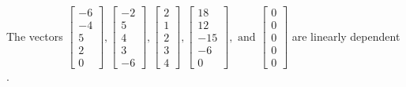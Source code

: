 \begin{exercise}
\begin{exerciseStatement}
  \end{exerciseStatement}
  \begin{exerciseAnswer}
   The vectors \(\left[\begin{array}{r}
-6 \\
-4 \\
5 \\
2 \\
0
\end{array}\right] , \left[\begin{array}{r}
-2 \\
5 \\
4 \\
3 \\
-6
\end{array}\right] , \left[\begin{array}{r}
2 \\
1 \\
2 \\
3 \\
4
\end{array}\right] , \left[\begin{array}{r}
18 \\
12 \\
-15 \\
-6 \\
0
\end{array}\right] , \text{ and } \left[\begin{array}{r}
0 \\
0 \\
0 \\
0 \\
0
\end{array}\right]\) are 
  	 linearly dependent  .
  


  \end{exerciseAnswer}
\end{exercise}